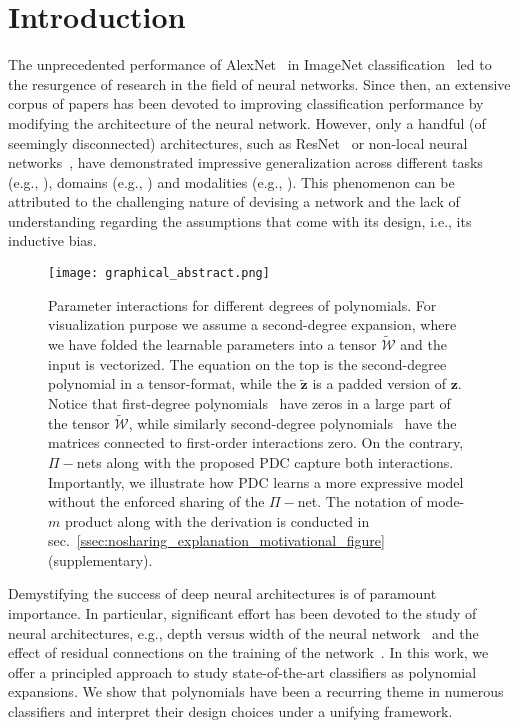 \documentclass[runningheads]{llncs}
\newcommand{\resnet}{ResNet}
\newcommand{\noshare}{PDC}
\providecommand{\invar}{z}
\providecommand{\binvar}{\bm{\invar}}
\providecommand\eg{e.g.,}
\begin{document}
\section{Introduction}
\label{sec:intro}

The unprecedented performance of AlexNet~\cite{krizhevsky2012imagenet} in ImageNet classification~\cite{russakovsky2015imagenet} led to the resurgence of research in the field of neural networks. 
Since then, an extensive corpus of papers has been devoted to improving classification performance by modifying the architecture of the neural network. 
However, only a handful (of seemingly disconnected) architectures, such as \resnet~\cite{he2015deep} or non-local neural networks~\cite{wang2018non}, have demonstrated impressive generalization across different tasks (\eg{} \cite{zhang2018self}), domains (\eg{} \cite{won2019toward}) and modalities (\eg{} \cite{kim2018bilinear}). This phenomenon can be attributed to the challenging nature of devising a network and the lack of understanding regarding the assumptions that come with its design, i.e., its inductive bias. 

\begin{figure}[t!]
  \centering
    \texttt{[image: graphical\_abstract.png]}
  \caption{Parameter interactions for different degrees of polynomials. For visualization purpose we assume a second-degree expansion, where we have folded the learnable parameters into a tensor $\tilde{\bm{\mathcal{W}}}$ and the input is vectorized. The equation on the top is the second-degree polynomial in a tensor-format, while the $\tilde{\binvar}$ is a padded version of $\binvar$. Notice that first-degree polynomials~\cite{he2015deep, krizhevsky2012imagenet, simonyan2014very} have zeros in a large part of the tensor $\tilde{\bm{\mathcal{W}}}$, while similarly second-degree polynomials~\cite{hu2018squeeze,li2019selective} have the matrices connected to first-order interactions zero. On the contrary, $\Pi-$nets along with the proposed \noshare{} capture both interactions. Importantly, we illustrate how \noshare{} learns a more expressive model without the enforced sharing of the $\Pi-$net. The notation of mode-$m$ product along with the derivation is conducted in sec.~\ref{ssec:nosharing_explanation_motivational_figure} (supplementary).}
  \label{fig:graphical_abstract}
\end{figure}

Demystifying the success of deep neural architectures is of paramount importance. 
In particular, significant effort has been devoted to the study of neural architectures, \eg{} depth versus width of the neural network~\cite{rolnick2017power, hanin2019universal} and the effect of residual connections on the training of the network~\cite{hardt2016identity, huang2017densely, he2015deep}. In this work, we offer a principled approach to study state-of-the-art classifiers as polynomial expansions. We show that polynomials have been a recurring theme in numerous classifiers and interpret their design choices under a unifying framework. 
\end{document}
